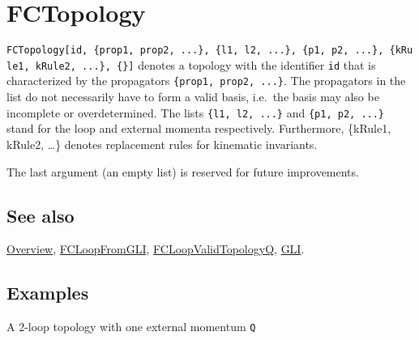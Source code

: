 \documentclass[../FeynCalcManual.tex]{subfiles}
\begin{document}
\begin{Shaded}
\begin{Highlighting}[]
 
\end{Highlighting}
\end{Shaded}

\hypertarget{fctopology}{
\section{FCTopology}\label{fctopology}}

\texttt{FCTopology[\allowbreak{}id,\ \allowbreak{}\{\allowbreak{}prop1,\ \allowbreak{}prop2,\ \allowbreak{}...\},\ \allowbreak{}\{\allowbreak{}l1,\ \allowbreak{}l2,\ \allowbreak{}...\},\ \allowbreak{}\{\allowbreak{}p1,\ \allowbreak{}p2,\ \allowbreak{}...\},\ \allowbreak{}\{\allowbreak{}kRule1,\ \allowbreak{}kRule2,\ \allowbreak{}...\},\ \allowbreak{}\{\allowbreak{}\}]}
denotes a topology with the identifier \texttt{id} that is characterized
by the propagators
\texttt{\{\allowbreak{}prop1,\ \allowbreak{}prop2,\ \allowbreak{}...\}}.
The propagators in the list do not necessarily have to form a valid
basis, i.e.~the basis may also be incomplete or overdetermined. The
lists \texttt{\{\allowbreak{}l1,\ \allowbreak{}l2,\ \allowbreak{}...\}}
and \texttt{\{\allowbreak{}p1,\ \allowbreak{}p2,\ \allowbreak{}...\}}
stand for the loop and external momenta respectively. Furthermore,
\{kRule1, kRule2, \ldots\} denotes replacement rules for kinematic
invariants.

The last argument (an empty list) is reserved for future improvements.

\subsection{See also}

\hyperlink{toc}{Overview}, \hyperlink{fcloopfromgli}{FCLoopFromGLI},
\hyperlink{fcloopvalidtopologyq}{FCLoopValidTopologyQ},
\hyperlink{gli}{GLI}.

\subsection{Examples}

A 2-loop topology with one external momentum \texttt{Q}
\end{document}

